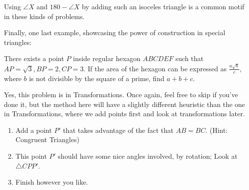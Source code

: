 \documentclass[mast]{lucky}
\begin{document}
Using $\angle X$ and $180-\angle X$ by adding such an isoceles triangle is a common motif in these kinds of problems.


Finally, one last example, showcasing the power of construction in special triangles:
\begin{exam}
There exists a point $P$ inside regular hexagon $ABCDEF$ such that $AP=\sqrt{3},BP=2,CP=3.$ If the area of the hexagon can be expressed as $\frac{a\sqrt{b}}{c},$ where $b$ is not divisible by the square of a prime, find $a+b+c.$
\end{exam}
Yes, this problem is in Transformations. Once again, feel free to skip if you've done it, but the method here will have a slightly different heuristic than the one in Transformations, where we add points first and look at transformations later.

\begin{walk}
    \begin{enumerate}
        \item Add a point $P'$ that takes advantage of the fact that $AB = BC$. (Hint: Congruent Triangles)
        \item This point $P'$ should have some nice angles involved, by rotation; Look at $\triangle CPP'$. 
        \item Finish however you like.
    \end{enumerate}
\end{walk}

\problems
\end{document}
